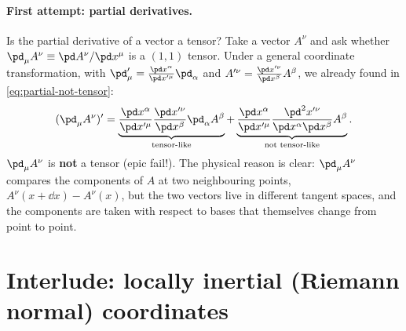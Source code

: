 \paragraph{First attempt: partial derivatives.} Is the partial derivative of a vector a tensor? Take a vector $A^\nu$ and ask whether $\pd_\mu A^\nu\equiv\pd A^\nu/\pd x^\mu$ is a $(1,1)$ tensor. Under a general coordinate transformation, with $\pd'_\mu=\frac{\pd x^\alpha}{\pd x'^\mu}\pd_\alpha$ and $A'^\nu=\frac{\pd x'^\nu}{\pd x^\beta}A^\beta$, we already found in \eqref{eq:partial-not-tensor}:
\begin{equation}
  (\pd_\mu A^\nu)'=\underbrace{\frac{\pd x^\alpha}{\pd x'^\mu}\frac{\pd x'^\nu}{\pd x^\beta}\pd_\alpha A^\beta}_{\text{tensor-like}}
  +\underbrace{\frac{\pd x^\alpha}{\pd x'^\mu}\frac{\pd^2x'^\nu}{\pd x^\alpha\pd x^\beta}A^\beta}_{\text{not tensor-like}} .
\end{equation}
$\pd_\mu A^\nu$ is \textbf{not} a tensor (epic fail!). The physical reason is clear: $\pd_\mu A^\nu$ compares the components of $A$ at two neighbouring points, $A^\nu(x+\dd x)-A^\nu(x)$, but the two vectors live in different tangent spaces, and the components are taken with respect to bases that themselves change from point to point.

\section{Interlude: locally inertial (Riemann normal) coordinates}

